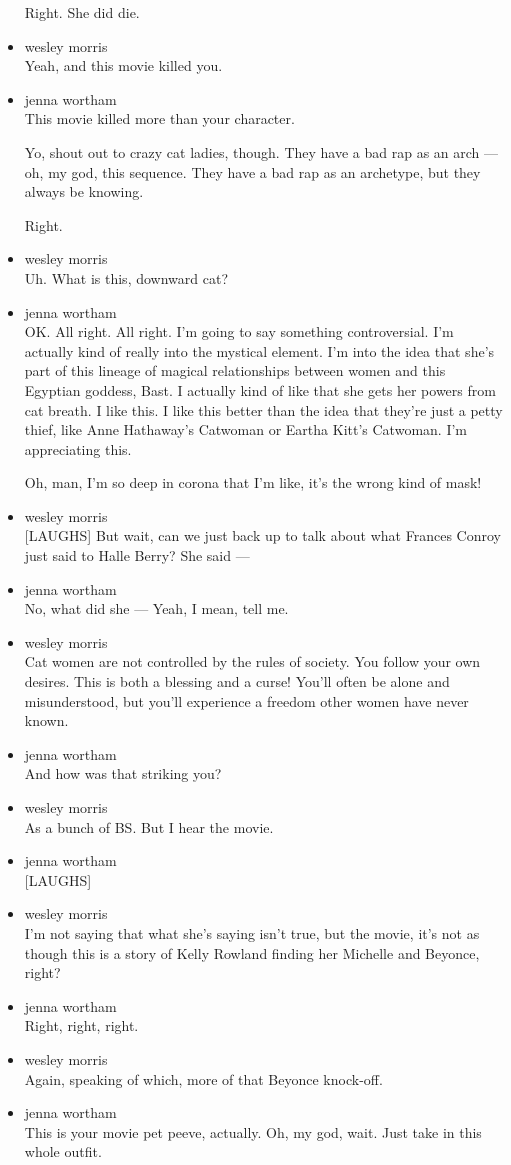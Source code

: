 \begin{itemize}
  Right. She did die.
\item
  wesley morris\\
  Yeah, and this movie killed you.
\item
  jenna wortham\\
  This movie killed more than your character.

  Yo, shout out to crazy cat ladies, though. They have a bad rap as an
  arch --- oh, my god, this sequence. They have a bad rap as an
  archetype, but they always be knowing.

  Right.
\item
  wesley morris\\
  Uh. What is this, downward cat?
\item
  jenna wortham\\
  OK. All right. All right. I'm going to say something controversial.
  I'm actually kind of really into the mystical element. I'm into the
  idea that she's part of this lineage of magical relationships between
  women and this Egyptian goddess, Bast. I actually kind of like that
  she gets her powers from cat breath. I like this. I like this better
  than the idea that they're just a petty thief, like Anne Hathaway's
  Catwoman or Eartha Kitt's Catwoman. I'm appreciating this.

  Oh, man, I'm so deep in corona that I'm like, it's the wrong kind of
  mask!
\item
  wesley morris\\
  {[}LAUGHS{]} But wait, can we just back up to talk about what Frances
  Conroy just said to Halle Berry? She said ---
\item
  jenna wortham\\
  No, what did she --- Yeah, I mean, tell me.
\item
  wesley morris\\
  Cat women are not controlled by the rules of society. You follow your
  own desires. This is both a blessing and a curse! You'll often be
  alone and misunderstood, but you'll experience a freedom other women
  have never known.
\item
  jenna wortham\\
  And how was that striking you?
\item
  wesley morris\\
  As a bunch of BS. But I hear the movie.
\item
  jenna wortham\\
  {[}LAUGHS{]}
\item
  wesley morris\\
  I'm not saying that what she's saying isn't true, but the movie, it's
  not as though this is a story of Kelly Rowland finding her Michelle
  and Beyonce, right?
\item
  jenna wortham\\
  Right, right, right.
\item
  wesley morris\\
  Again, speaking of which, more of that Beyonce knock-off.
\item
  jenna wortham\\
  This is your movie pet peeve, actually. Oh, my god, wait. Just take in
  this whole outfit.


\end{itemize}
